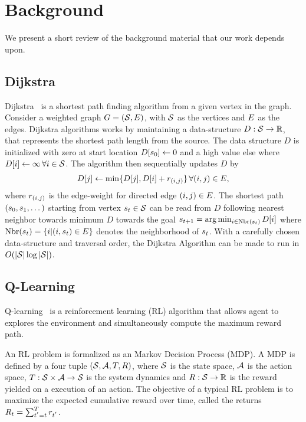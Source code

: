 \section{Background}

We present a short review of the background material that our work depends upon.

\subsection{Dijkstra}
\newcommand{\vertices}{\State}
\newcommand{\edge}{\rew}
\newcommand{\fwds}{D}
\newcommand{\dds}{D}
Dijkstra~\citep{dijkstra1959note} is a shortest path finding algorithm from a
given vertex in the graph. Consider a weighted graph $G = (\vertices,
\edges)$, with $\vertices$ as the vertices and $E$ as the edges. Dijkstra
algorithms works by maintaining a data-structure $\dds : \vertices \rightarrow
\R$, that represents the shortest path length from the source. The data
structure $\dds$ is initialized with zero at start location $\dds[\state_0]
\leftarrow 0$ and a high value else where $\dds[i] \leftarrow \infty \, \forall
i \in \vertices$. The algorithm then sequentially updates $\dds$ by
%
\begin{align}
  \dds[j] \leftarrow \min\{\dds[j], \dds[i] + \edge_{(i, j)} \} \, \forall (i, j) \in \edges ,
  \label{eq:dijkstra}
\end{align}%
%
where $\edge_{(i, j)}$ is the edge-weight for directed edge $(i, j) \in E$.
The shortest path $(s_0, s_{1}, \dots)$ starting from vertex
$\state_t \in \vertices$ can be read from $\dds$ following nearest neighbor
towards minimum $\fwds$ towards the goal $\state_{t+1} = \arg \min_{i \in
\text{Nbr}(\state_t)} \dds[i]$ where $\text{Nbr}(s_t) = \{ i | (i,
s_t) \in E \} $ denotes the neighborhood of $s_t$. With a
carefully chosen data-structure and traversal order, the Dijkstra Algorithm can
be made to run in $O(|\vertices|\log|\vertices|)$.

\subsection{Q-Learning}
Q-learning~\citep{watkins1992qlearning} is a reinforcement learning (RL)
algorithm that allows agent to explores the environment and simultaneously
compute the maximum reward path.

An RL problem is formalized as an Markov Decision Process (MDP). A MDP is
defined by a four tuple $(\mathcal{S}, \mathcal{A}, T, R)$, where $\mathcal{S}$ is the
state space, $\mathcal{A}$ is the action space, $T : \mathcal{S} \times \mathcal{A}
\rightarrow \mathcal{S}$ is the system dynamics and $R : \mathcal{S}
\rightarrow \mathbb{R} $ is the reward yielded on a execution of an action.
The objective of a typical RL problem is to maximize the expected cumulative
reward over time, called the returns  $ R_t = \sum_{t^{'}=t}^{T} r_{t^{'}}$.

